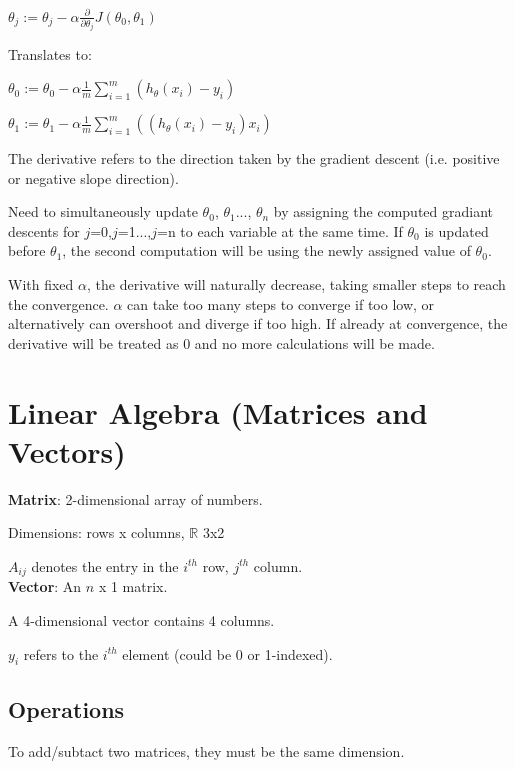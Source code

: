 \documentclass[12pt, a4paper]{article}
\begin{document}
    $\theta_j := \theta_j - \alpha\frac {\partial}
    {\partial\theta_j} J(\theta_0, \theta_1)$

    \newpage

    Translates to:

    $\theta_0 := \theta_0 - \alpha \frac{1}{m} 
    \sum\limits_{i=1}^{m}(h_\theta(x_{i}) - y_{i})$

    $\theta_1 := \theta_1 - \alpha \frac{1}{m} 
    \sum\limits_{i=1}^{m}((h_\theta(x_{i}) - y_{i})x_i)$

    The derivative refers to the direction taken by the gradient descent 
    (i.e. positive or negative slope direction).

    Need to simultaneously update $\theta_0$, $\theta_1$..., 
    $\theta_n$ by assigning the computed gradiant descents for 
    $j$=0,$j$=1...,$j$=n to each variable at the same time. If $\theta_0$ is 
    updated before $\theta_1$, the second computation will be using the newly 
    assigned value of $\theta_0$.

    With fixed $\alpha$, the derivative will naturally decrease, 
    taking smaller steps to reach the convergence. $\alpha$ can take 
    too many steps to converge if too low, or alternatively can 
    overshoot and diverge if too high. If already at convergence, 
    the derivative will be treated as 0 and no more calculations 
    will be made. 

  \newpage

\section{Linear Algebra (Matrices and Vectors)}

  \textbf{Matrix}: 2-dimensional array of numbers.

  Dimensions: rows x columns, $\mathbb{R}$ 3x2

  $A_{ij}$ denotes the entry in the $i^{th}$ row, $j^{th}$ column.\\

  \textbf{Vector}: An $n$ x 1 matrix.

  A 4-dimensional vector contains 4 columns.

  $y_i$ refers to the $i^{th}$ element (could be 0 or 1-indexed).

  \subsection{Operations}

    To add/subtact two matrices, they must be the same dimension.
    
\end{document}
